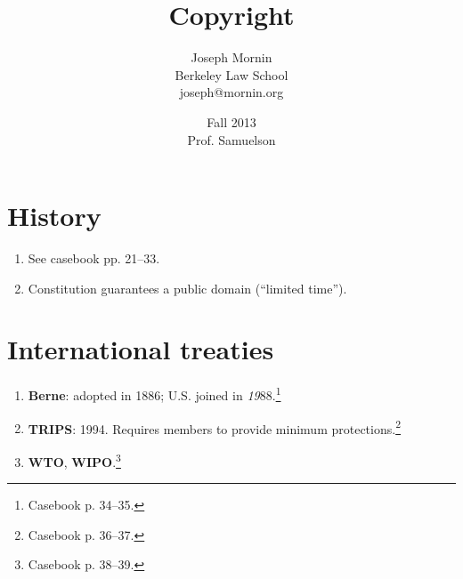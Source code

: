 \documentclass[letterpaper,titlepage]{article}
\begin{document}
\title{Copyright}
\author{Joseph Mornin\\Berkeley Law School\\joseph@mornin.org}
\date{Fall 2013\\Prof. Samuelson}
\maketitle
\tableofcontents
\pagebreak


\newpage

\newpage

\newpage

\newpage

\newpage

\newpage



\section{History}

\begin{enumerate}
    \item See casebook pp. 21--33.
    \item Constitution guarantees a public domain (``limited time'').
\end{enumerate}

\section{International treaties}

\begin{enumerate}
    \item \textbf{Berne}: adopted in 1886; U.S. joined in 
    \emph{19}88.\footnote{Casebook p. 34--35.}
    \item \textbf{TRIPS}: 1994. Requires members to provide minimum 
    protections.\footnote{Casebook p. 36--37.}
    \item \textbf{WTO}, \textbf{WIPO}.\footnote{Casebook p. 38--39.}
\end{enumerate}
\end{document}
